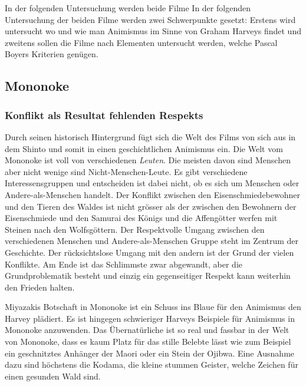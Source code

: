 \medskip

In der folgenden Untersuchung werden beide Filme
In der folgenden Untersuchung der beiden Filme werden zwei Schwerpunkte gesetzt: Erstens wird untersucht wo und wie man Animismus im Sinne von Graham Harveys findet und zweitens sollen die Filme nach Elementen untersucht werden, welche Pascal Boyers Kriterien genügen.

\subsection{Mononoke}
\subsubsection{Konflikt als Resultat fehlenden Respekts}
Durch seinen historisch Hintergrund fügt sich die Welt des Films von sich aus in dem Shinto und somit in einen geschichtlichen Animismus ein. Die Welt vom Mononoke ist voll von verschiedenen \emph{Leuten}. Die meisten davon sind Menschen aber nicht wenige sind Nicht-Menschen-Leute. Es gibt verschiedene Interessensgruppen und entscheiden ist dabei nicht, ob es sich um Menschen oder Andere-als-Menschen handelt. Der Konflikt zwischen den Eisenschmiedebewohner und den Tieren des Waldes ist nicht grösser als der zwischen den Bewohnern der Eisenschmiede und den Samurai des Königs und die Affengötter werfen mit Steinen nach den Wolfsgöttern. Der Respektvolle Umgang zwischen den verschiedenen Menschen und Andere-als-Menschen Gruppe steht im Zentrum der Geschichte. Der rücksichtslose Umgang mit den andern ist der Grund der vielen Konflikte. Am Ende ist das Schlimmste zwar abgewandt, aber die Grundproblematik besteht und einzig ein gegenseitiger Respekt kann weiterhin den Frieden halten.

Miyazakis Botschaft in Mononoke ist ein Schuss ins Blaue für den Animismus den Harvey plädiert. Es ist hingegen schwieriger Harveys Beispiele für Animismus in Mononoke anzuwenden. Das Übernatürliche ist so real und fassbar in der Welt von Mononoke, dass es kaum Platz für das stille Belebte lässt wie zum Beispiel ein geschnitztes Anhänger der Maori oder ein Stein der Ojibwa. Eine Ausnahme dazu sind höchstens die Kodama, die kleine stummen Geister, welche Zeichen für einen gesunden Wald sind. 

